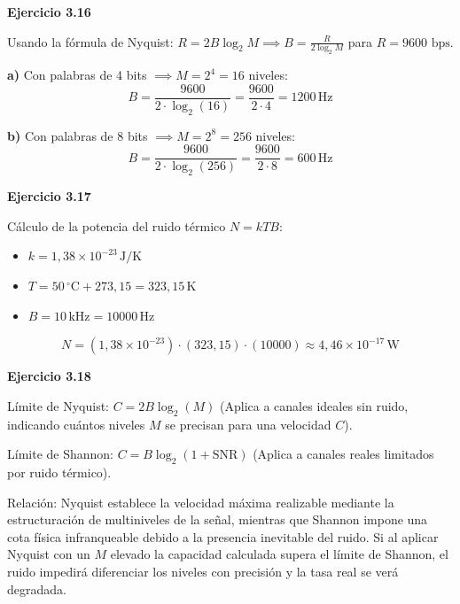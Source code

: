 \documentclass[11pt,a4paper]{article}
\begin{document}
\vspace{0.3cm}
\noindent\textbf{Ejercicio 3.16}\par
Usando la fórmula de Nyquist: $R = 2B \log_2 M \implies B = \frac{R}{2 \log_2 M}$ para $R = 9600\text{ bps}$.

\noindent\textbf{a)} Con palabras de 4 bits $\implies M = 2^4 = 16$ niveles:
\[
  B = \frac{9600}{2 \cdot \log_2(16)} = \frac{9600}{2 \cdot 4} = 1200\,\mathrm{Hz}
\]

\noindent\textbf{b)} Con palabras de 8 bits $\implies M = 2^8 = 256$ niveles:
\[
  B = \frac{9600}{2 \cdot \log_2(256)} = \frac{9600}{2 \cdot 8} = 600\,\mathrm{Hz}
\]

\vspace{0.3cm}
\noindent\textbf{Ejercicio 3.17}\par
Cálculo de la potencia del ruido térmico $N = k T B$:
\begin{itemize}
  \item $k = 1{,}38 \times 10^{-23}\,\mathrm{J/K}$
  \item $T = 50\,^\circ\mathrm{C} + 273{,}15 = 323{,}15\,\mathrm{K}$
  \item $B = 10\,\mathrm{kHz} = 10000\,\mathrm{Hz}$
\end{itemize}
\[
  N = (1{,}38 \times 10^{-23}) \cdot (323{,}15) \cdot (10000) \approx 4{,}46 \times 10^{-17}\,\mathrm{W}
\]

\vspace{0.3cm}
\noindent\textbf{Ejercicio 3.18}\par
Límite de Nyquist: $C = 2B \log_2(M)$ (Aplica a canales ideales sin ruido, indicando cuántos niveles $M$ se precisan para una velocidad $C$).\par
Límite de Shannon: $C = B \log_2(1 + \mathrm{SNR})$ (Aplica a canales reales limitados por ruido térmico).\par
Relación: Nyquist establece la velocidad máxima realizable mediante la estructuración de multiniveles de la señal, mientras que Shannon impone una cota física infranqueable debido a la presencia inevitable del ruido. Si al aplicar Nyquist con un $M$ elevado la capacidad calculada supera el límite de Shannon, el ruido impedirá diferenciar los niveles con precisión y la tasa real se verá degradada.
\end{document}
